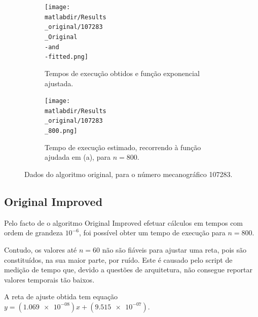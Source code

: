 \documentclass[portuguese,11pt,a4paper,titlepage]{article}
\newcommand{\matlabdir}{"../MATLAB-fittings"}
\begin{document}
\begin{figure}[h]
	\begin{subfigure}{0.47\textwidth}
	\texttt{[image: \\matlabdir/Results\\\_original/107283\\\_Original\\-and\\-fitted.png]} 
	\caption{Tempos de execução obtidos e função exponencial ajustada.}
	\label{fig:original_107283_plot}
	\end{subfigure}
	\hspace{0.049\textwidth}
	\begin{subfigure}{0.47\textwidth}
	\texttt{[image: \\matlabdir/Results\\\_original/107283\\\_800.png]}
	\caption{Tempo de execução estimado, recorrendo à função ajudada em (a), para \begin{math}n=800\end{math}.}
	\label{fig:original_107283_800}
	\end{subfigure}
	
	\caption{Dados do algoritmo original, para o número mecanográfico 107283.}
	\label{fig:original_107283}
\end{figure}

\subsection{Original Improved}
Pelo facto de o algoritmo Original Improved efetuar cálculos em tempos com ordem de grandeza
\begin{math}10^{-6}\end{math}, foi possível obter um tempo de execução para \begin{math}n = 800\end{math}.

Contudo, os valores até \begin{math}n = 60\end{math} não são fiáveis para ajustar uma reta,
pois são constituídos, na sua maior parte, por ruído.
Este é causado pelo script de medição de tempo que, devido a questões de arquitetura,
não consegue reportar valores temporais tão baixos.

A reta de ajuste obtida tem equação \begin{math}y=(\num{1.069e-08})x+(\num{9.515e-07})\end{math}.
\end{document}
